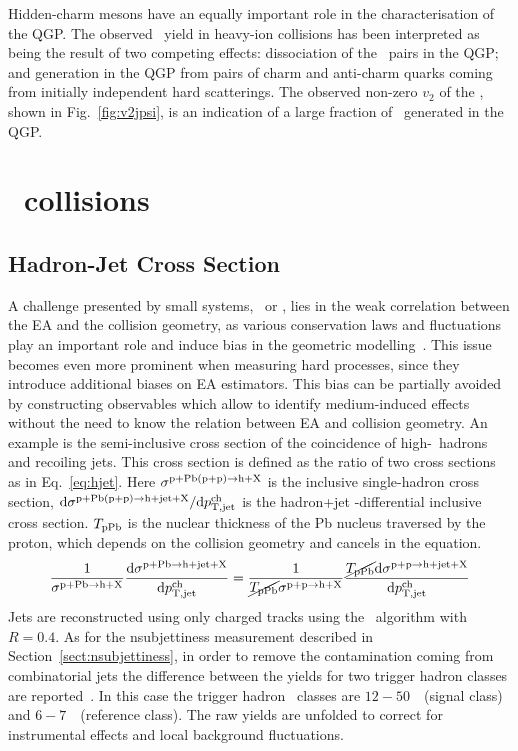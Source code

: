 \documentclass[10pt]{article}
\begin{document}
Hidden-charm mesons have an equally important role in the characterisation of the QGP.
The observed \jpsi\ yield in heavy-ion collisions has been interpreted as being the result of two competing effects: dissociation of the \ccbar\ pairs in the QGP; and generation in the QGP from pairs of charm and anti-charm quarks coming from initially independent hard scatterings.
The observed non-zero $v_2$ of the \jpsi, shown in Fig.~\ref{fig:v2jpsi}, is an indication of a large fraction of \jpsi\ generated in the QGP.

\section{\pPb\ collisions}

\subsection{Hadron-Jet Cross Section} 
A challenge presented by small systems, \pp\ or \pPb, lies in the weak correlation between the EA and the collision geometry,
as various conservation laws and fluctuations play an important role and induce bias in the geometric modelling~\cite{ALICE:2014e}. 
This issue becomes even more prominent when measuring hard processes, since they introduce additional biases on EA estimators.
This bias can be partially avoided by constructing observables which allow to identify medium-induced effects without the need to know the relation between EA and collision geometry. 
An example is the semi-inclusive cross section of the coincidence of high-\pt\ hadrons and recoiling jets.
This cross section is defined as the ratio of two cross sections as in Eq.~\ref{eq:hjet}. Here $\sigma^{{\rm p+Pb (p+p)}\rightarrow{\rm h+X}}$ is the inclusive single-hadron cross
section, $\mathrm{d}\sigma^{{\rm p+Pb (p+p)}\rightarrow{\rm h+jet+X}}/ \mathrm{d}p_{\rm T,jet}^{\rm ch}$ is the hadron+jet \pt-differential inclusive cross section.
$T_{\rm pPb}$ is the nuclear thickness of the Pb nucleus traversed by the proton, which depends on the collision geometry and cancels in the equation.
\begin{equation}
\frac{1}{\sigma^{{\rm p+Pb}\rightarrow{\rm h+X}}} \frac{\mathrm{d}\sigma^{{\rm p+Pb}\rightarrow{\rm h+jet+X}}}{\mathrm{d}p_{\rm T,jet}^{\rm ch}} = 
\frac{1}{\cancel{T_{\rm pPb}}\sigma^{{\rm p+p}\rightarrow{\rm h+X}}} \frac{\cancel{T_{\rm pPb}}\mathrm{d}\sigma^{{\rm p+p}\rightarrow{\rm h+jet+X}}}{\mathrm{d}p_{\rm T,jet}^{\rm ch}}
\label{eq:hjet}
\end{equation}
Jets are reconstructed using only charged tracks using the \antikt\ algorithm with $R=0.4$.
As for the nsubjettiness measurement described in Section~\ref{sect:nsubjettiness}, in order to remove the contamination coming from combinatorial jets the difference between the yields
for two trigger hadron classes are reported~\cite{ALICE:2015g}. In this case the trigger hadron \pt\ classes are $12-50$~\GeVc\ (signal class) and $6-7$~\GeVc\ (reference class).
The raw yields are unfolded to correct for instrumental effects and local background fluctuations.
\end{document}

